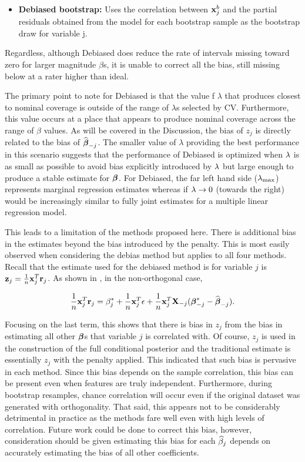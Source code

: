 \begin{itemize}
\item \textbf{Debiased bootstrap:} Uses the correlation between $\boldsymbol{\mathbf{x}}^b_j$ and the partial residuals obtained from the model for each bootstrap sample as the bootstrap draw for variable j.
\end{itemize}

Regardless, although Debiased does reduce the rate of intervals missing toward zero for larger magnitude $\beta$s, it is unable to correct all the bias, still missing below at a rater higher than ideal.

The primary point to note for Debiased is that the value f $\lambda$ that produces closest to nominal coverage is outside of the range of $\lambda$s selected by CV. Furthermore, this value occurs at a place that appears to produce nominal coverage across the range of $\beta$ values. As will be covered in the Discussion, the bias of $z_j$ is directly related to the bias of $\widehat{\boldsymbol{\beta}}_{-j}$. The smaller value of $\lambda$ providing the best performance in this scenario suggests that the performance of Debiased is optimized when $\lambda$ is as small as possible to avoid bias explicitly introduced by $\lambda$ but large enough to produce a stable estimate for $\boldsymbol{\beta}$. For Debiased, the far left hand side ($\lambda_{\max}$) represents marginal regression estimates whereas if $\lambda \rightarrow 0$ (towards the right) would be increasingly similar to fully joint estimates for a multiple linear regression model.

This leads to a limitation of the methods proposed here. There is additional bias in the estimates beyond the bias introduced by the penalty. This is most easily observed when considering the debias method but applies to all four methods. Recall that the estimate used for the debiased method is for variable $j$ is $\mathbf{z}_j = \frac{1}{n}\mathbf{x}^T_j \mathbf{r}_j$. As shown in \cite{Breheny2019}, in the non-orthogonal case, 

$$
\frac{1}{n}\mathbf{x}^T_j \mathbf{r}_j = \beta^*_j + \frac{1}{n}\mathbf{x}_j^T \epsilon + \frac{1}{n}\mathbf{x}_j^T \mathbf{X}_{-j}(\boldsymbol{\beta}^*_{-j} - \widehat{\boldsymbol{\beta}}_{-j}).
$$

Focusing on the last term, this shows that there is bias in $z_j$ from the bias in estimating all other $\boldsymbol{\beta}$s that variable $j$ is correlated with. Of course, $z_j$ is used in the construction of the full conditional posterior and the traditional estimate is essentially $z_j$ with the penalty applied. This indicated that such bias is pervasive in each method. Since this bias depends on the sample correlation, this bias can be present even when features are truly independent. Furthermore, during bootstrap resamples, chance correlation will occur even if the original dataset was generated with orthogonality. That said, this appears not to be considerably detrimental in practice as the methods fare well even with high levels of correlation. Future work could be done to correct this bias, however, consideration should be given estimating this bias for each $\widehat{\beta}_j$ depends on accurately estimating the bias of all other coefficients.

